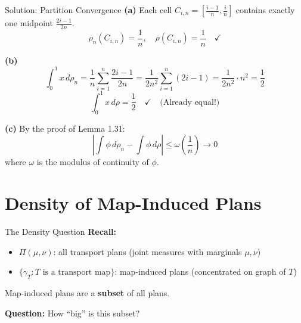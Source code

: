 \documentclass[aspectratio=169]{beamer}
\begin{document}
\begin{frame}{Solution: Partition Convergence}
\textbf{(a)} Each cell $C_{i,n} = \left[\frac{i-1}{n}, \frac{i}{n}\right]$ contains exactly one midpoint $\frac{2i-1}{2n}$.
\[
\rho_n(C_{i,n}) = \frac{1}{n}, \quad \rho(C_{i,n}) = \frac{1}{n} \quad \checkmark
\]

\vspace{0.3cm}
\textbf{(b)}
\[
\int_0^1 x \, d\rho_n = \frac{1}{n} \sum_{i=1}^{n} \frac{2i-1}{2n} = \frac{1}{2n^2} \sum_{i=1}^{n} (2i-1) = \frac{1}{2n^2} \cdot n^2 = \boxed{\frac{1}{2}}
\]
\[
\int_0^1 x \, d\rho = \frac{1}{2} \quad \checkmark \quad \text{(Already equal!)}
\]

\vspace{0.3cm}
\textbf{(c)} By the proof of Lemma 1.31:
\[
\left|\int \phi \, d\rho_n - \int \phi \, d\rho\right| \leq \omega\left(\frac{1}{n}\right) \to 0
\]
where $\omega$ is the modulus of continuity of $\phi$.
\end{frame}

\section{Density of Map-Induced Plans}

\begin{frame}{The Density Question}
\textbf{Recall:}
\begin{itemize}
    \item $\Pi(\mu, \nu)$: all transport plans (joint measures with marginals $\mu, \nu$)
    \item $\{\gamma_T : T \text{ is a transport map}\}$: map-induced plans (concentrated on graph of $T$)
\end{itemize}

\vspace{0.3cm}
Map-induced plans are a \textbf{subset} of all plans.

\vspace{0.4cm}
\textbf{Question:} How ``big'' is this subset?

\begin{center}
\end{center}
\end{frame}
\end{document}
